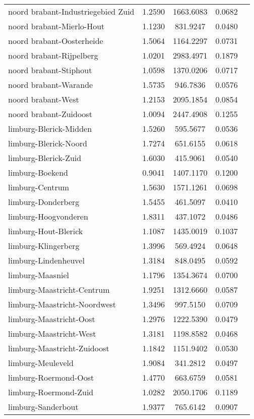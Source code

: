 \begin{longtable}{llccc}
noord brabant-Industriegebied Zuid & 1.2590 & 1663.6083 & 0.0682 \\
noord brabant-Mierlo-Hout & 1.1230 & 831.9247 & 0.0480 \\
noord brabant-Oosterheide & 1.5064 & 1164.2297 & 0.0731 \\
noord brabant-Rijpelberg & 1.0201 & 2983.4971 & 0.1879 \\
noord brabant-Stiphout & 1.0598 & 1370.0206 & 0.0717 \\
noord brabant-Warande & 1.5735 & 946.7836 & 0.0576 \\
noord brabant-West & 1.2153 & 2095.1854 & 0.0854 \\
noord brabant-Zuidoost & 1.0094 & 2447.4908 & 0.1255 \\
limburg-Blerick-Midden & 1.5260 & 595.5677 & 0.0536 \\
limburg-Blerick-Noord & 1.7274 & 651.6155 & 0.0618 \\
limburg-Blerick-Zuid & 1.6030 & 415.9061 & 0.0540 \\
limburg-Boekend & 0.9041 & 1407.1170 & 0.1200 \\
limburg-Centrum & 1.5630 & 1571.1261 & 0.0698 \\
limburg-Donderberg & 1.5455 & 461.5097 & 0.0410 \\
limburg-Hoogvonderen & 1.8311 & 437.1072 & 0.0486 \\
limburg-Hout-Blerick & 1.1087 & 1435.0019 & 0.1037 \\
limburg-Klingerberg & 1.3996 & 569.4924 & 0.0648 \\
limburg-Lindenheuvel & 1.3184 & 848.0495 & 0.0592 \\
limburg-Maasniel & 1.1796 & 1354.3674 & 0.0700 \\
limburg-Maastricht-Centrum & 1.9251 & 1312.6660 & 0.0587 \\
limburg-Maastricht-Noordwest & 1.3496 & 997.5150 & 0.0709 \\
limburg-Maastricht-Oost & 1.2976 & 1222.5390 & 0.0479 \\
limburg-Maastricht-West & 1.3181 & 1198.8582 & 0.0468 \\
limburg-Maastricht-Zuidoost & 1.1842 & 1151.9402 & 0.0530 \\
limburg-Meuleveld & 1.9084 & 341.2812 & 0.0497 \\
limburg-Roermond-Oost & 1.4770 & 663.6759 & 0.0581 \\
limburg-Roermond-Zuid & 1.0282 & 2050.1706 & 0.1189 \\
limburg-Sanderbout & 1.9377 & 765.6142 & 0.0907 \\

\end{longtable}

